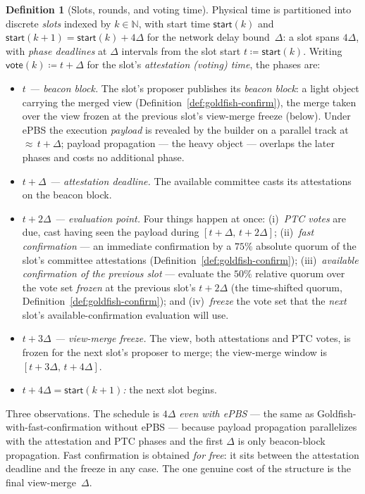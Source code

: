 \ifx\litemode\undefined\documentclass{article}\fi
\newcommand{\start}{\ensuremath{\mathsf{start}}}
\newcommand{\vote}{\ensuremath{\mathsf{vote}}}
\theoremstyle{plain}
\theoremstyle{definition}
\newtheorem{definition}{Definition}
\theoremstyle{remark}
\begin{document}
\begin{definition}[Slots, rounds, and voting time]\label{def:slots}
Physical time is partitioned into discrete \emph{slots} indexed by
$k \in \mathbb{N}$, with start time $\start(k)$ and
$\start(k+1) = \start(k) + 4\Delta$ for the network delay bound~$\Delta$: a
slot spans $4\Delta$, with \emph{phase deadlines} at $\Delta$ intervals from
the slot start $t \coloneqq \start(k)$.  Writing
$\vote(k) \coloneqq t + \Delta$ for the slot's \emph{attestation (voting)
time}, the phases are:
\begin{itemize}
  \item \emph{$t$ --- beacon block.}  The slot's proposer publishes its
    \emph{beacon block}: a light object carrying the merged view
    (Definition~\ref{def:goldfish-confirm}), the merge taken over the view
    frozen at the previous slot's view-merge freeze (below).  Under ePBS the
    execution \emph{payload} is revealed by the builder on a parallel track at
    ${\approx}\,t+\Delta$; payload propagation --- the heavy object --- overlaps
    the later phases and costs no additional phase.
  \item \emph{$t+\Delta$ --- attestation deadline.}  The available committee
    casts its attestations on the beacon block.
  \item \emph{$t+2\Delta$ --- evaluation point.}  Four things happen at once:
    (i)~\emph{PTC votes} are due, cast having seen the payload during
    $[t+\Delta,\, t+2\Delta]$; (ii)~\emph{fast confirmation} --- an immediate
    confirmation by a $75\%$ absolute quorum of the slot's committee
    attestations (Definition~\ref{def:goldfish-confirm}); (iii)~\emph{available
    confirmation of the previous slot} --- evaluate the $50\%$ relative quorum
    over the vote set \emph{frozen} at the previous slot's $t+2\Delta$ (the
    time-shifted quorum, Definition~\ref{def:goldfish-confirm}); and
    (iv)~\emph{freeze} the vote set that the \emph{next} slot's
    available-confirmation evaluation will use.
  \item \emph{$t+3\Delta$ --- view-merge freeze.}  The view, both attestations
    and PTC votes, is frozen for the next slot's proposer to merge; the
    view-merge window is $[t+3\Delta,\, t+4\Delta]$.
  \item \emph{$t+4\Delta = \start(k+1)$:} the next slot begins.
\end{itemize}
Three observations.  The schedule is $4\Delta$ \emph{even with ePBS} --- the
same as Goldfish-with-fast-confirmation without ePBS --- because payload
propagation parallelizes with the attestation and PTC phases and the first
$\Delta$ is only beacon-block propagation.  Fast confirmation is obtained
\emph{for free}: it sits between the attestation deadline and the freeze in any
case.  The one genuine cost of the structure is the final view-merge~$\Delta$.


\end{definition}
\end{document}
